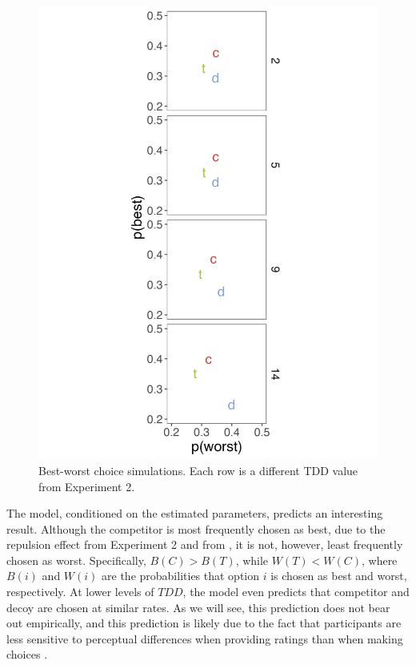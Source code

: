 \begin{figure}
   \includegraphics[width=\linewidth]{figures/bw_preds_sigma_constant_comp_effect_no_outliers.jpeg}
   \caption{Best-worst choice simulations. Each row is a different TDD value from Experiment 2.}
   \label{fig:bw_sim}
\end{figure}

The model, conditioned on the estimated parameters, predicts an interesting result. Although the competitor is most frequently chosen as best, due to the repulsion effect from Experiment 2 and from \textcite{spektorWhenGoodLooks2018b}, it is not, however, least frequently chosen as worst. Specifically, $B(C)>B(T)$, while $W(T)<W(C)$, where $B(i)$ and $W(i)$ are the probabilities that option $i$ is chosen as best and worst, respectively. At lower levels of $TDD$, the model even predicts that competitor and decoy are chosen at similar rates. As we will see, this prediction does not bear out empirically, and this prediction is likely due to the fact that participants are less sensitive to perceptual differences when providing ratings than when making choices \parencite{gronau2023choice}.


